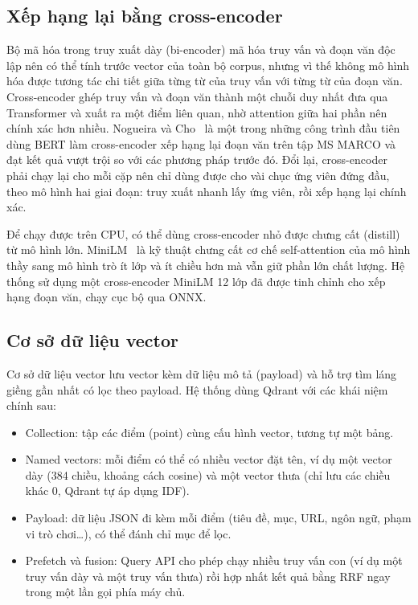 \subsection{Xếp hạng lại bằng cross-encoder}
\label{sec:rerank}

Bộ mã hóa trong truy xuất dày (bi-encoder) mã hóa truy vấn và đoạn văn độc lập nên có thể tính trước vector của toàn bộ corpus, nhưng vì thế không mô hình hóa được tương tác chi tiết giữa từng từ của truy vấn với từng từ của đoạn văn. Cross-encoder ghép truy vấn và đoạn văn thành một chuỗi duy nhất đưa qua Transformer và xuất ra một điểm liên quan, nhờ attention giữa hai phần nên chính xác hơn nhiều. Nogueira và Cho~\cite{nogueira2019rerank} là một trong những công trình đầu tiên dùng BERT làm cross-encoder xếp hạng lại đoạn văn trên tập MS MARCO và đạt kết quả vượt trội so với các phương pháp trước đó. Đổi lại, cross-encoder phải chạy lại cho mỗi cặp nên chỉ dùng được cho vài chục ứng viên đứng đầu, theo mô hình hai giai đoạn: truy xuất nhanh lấy ứng viên, rồi xếp hạng lại chính xác.

Để chạy được trên CPU, có thể dùng cross-encoder nhỏ được chưng cất (distill) từ mô hình lớn. MiniLM~\cite{wang2020minilm} là kỹ thuật chưng cất cơ chế self-attention của mô hình thầy sang mô hình trò ít lớp và ít chiều hơn mà vẫn giữ phần lớn chất lượng. Hệ thống sử dụng một cross-encoder MiniLM 12 lớp đã được tinh chỉnh cho xếp hạng đoạn văn, chạy cục bộ qua ONNX.

\subsection{Cơ sở dữ liệu vector}
\label{sec:vectordb}

Cơ sở dữ liệu vector lưu vector kèm dữ liệu mô tả (payload) và hỗ trợ tìm láng giềng gần nhất có lọc theo payload. Hệ thống dùng Qdrant với các khái niệm chính sau:
\begin{itemize}
    \item Collection: tập các điểm (point) cùng cấu hình vector, tương tự một bảng.
    \item Named vectors: mỗi điểm có thể có nhiều vector đặt tên, ví dụ một vector dày  (384 chiều, khoảng cách cosine) và một vector thưa  (chỉ lưu các chiều khác 0, Qdrant tự áp dụng IDF).
    \item Payload: dữ liệu JSON đi kèm mỗi điểm (tiêu đề, mục, URL, ngôn ngữ, phạm vi trò chơi\ldots), có thể đánh chỉ mục để lọc.
    \item Prefetch và fusion: Query API cho phép chạy nhiều truy vấn con (ví dụ một truy vấn dày và một truy vấn thưa) rồi hợp nhất kết quả bằng RRF ngay trong một lần gọi phía máy chủ.
\end{itemize}


